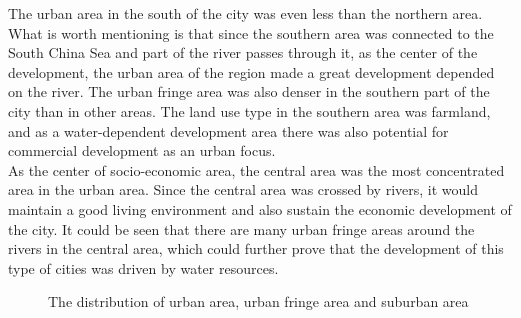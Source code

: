 The urban area in the south of the city was even less than the northern area. What is worth mentioning is that since the southern area was connected to the South China Sea and part of the river passes through it, as the center of the development, the urban area of the region made a great development depended on the river. The urban fringe area was also denser in the southern part of the city than in other areas. The land use type in the southern area was farmland, and as a water-dependent development area there was also potential for commercial development as an urban focus.\\

As the center of socio-economic area, the central area was the most concentrated area in the urban area. Since the central area was crossed by rivers, it would maintain a good living environment and also sustain the economic development of the city. It could be seen that there are many urban fringe areas around the rivers in the central area, which could further prove that the development of this type of cities was driven by water resources.\\

\begin{figure}[H]
\centering
{}
\quad
{}

\caption{The distribution of urban area, urban fringe area and suburban area}
\label{fringe}
\end{figure}

